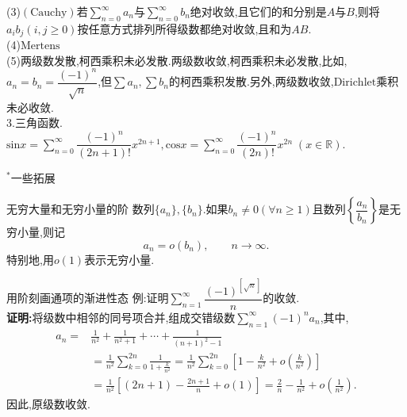 \documentclass[UTF8]{ctexbeamer}
\begin{document}
    \begin{frame}
        \hspace*{20pt}(3)$(\mathrm{Cauchy})$若$\sum\limits_{n=0}^{\infty}a_n$与$\sum\limits_{n=0}^{\infty}b_n$绝对收敛,且它们的和分别是$A$与$B$,则将$a_ib_j(i,j\geqslant 0)$按任意方式排列所得级数都绝对收敛,且和为$AB$.
        \\\hspace*{20pt}(4)$\mathrm{Mertens}$
        \\\hspace*{20pt}(5)两级数发散,柯西乘积未必发散.两级数收敛,柯西乘积未必发散,比如,$a_n=b_n=\dfrac{(-1)^n}{\sqrt{n}}$,但$\sum a_n,\sum b_n$的柯西乘积发散.另外,两级数收敛,$\mathrm{Dirichlet}$乘积未必收敛.
    \\3.三角函数.
    \\\hspace*{20pt}$\mathrm{sin}x=\sum\limits_{n=0}^{\infty}\dfrac{(-1)^n}{(2n+1)!}x^{2n+1},\mathrm{cos}x=\sum\limits_{n=0}^{\infty}\dfrac{(-1)^n}{(2n)!}x^{2n}\;(x\in\mathbb{R})$.
    \end{frame}
    \begin{frame}
        \begin{block}{}
           \begin{center}
               \Huge{$^\ast$一些拓展}
           \end{center}
        \end{block}
    \end{frame}
    \begin{frame}{无穷大量和无穷小量的阶}
        数列$\{a_n\},\{b_n\}$.如果$b_n\neq 0(\forall n\geqslant 1)$且数列$\left\{\dfrac{a_n}{b_n}\right\}$是无穷小量,则记
        $$
        a_n=o(b_n),\qquad n\to\infty.
        $$
        特别地,用$o(1)$表示无穷小量.
    \end{frame}
    \begin{frame}{用阶刻画通项的渐进性态}
        例:证明$\sum\limits_{n=1}^{\infty}\dfrac{(-1)^{[\sqrt{n}]}}{n}$的收敛.
        \pause
        \\\textbf{证明:}将级数中相邻的同号项合并,组成交错级数$\sum\limits_{n=1}^{\infty}(-1)^na_n$,其中,
        $$\begin{aligned}
            a_n=&\frac{1}{n^2}+\frac{1}{n^2+1}+\cdots+\frac{1}{(n+1)^2-1}\\
            &=\frac{1}{n^2}\sum\limits_{k=0}^{2n}\frac{1}{1+\frac{k}{n^2}}=\frac{1}{n^2}\sum\limits_{k=0}^{2n}\left[1-\frac{k}{n^2}+o\left(\frac{k}{n^2}\right)\right]\\
            &=\frac{1}{n^2}\left[(2n+1)-\frac{2n+1}{n}+o(1)\right]=\frac{2}{n}-\frac{1}{n^2}+o\left(\frac{1}{n^2}\right).
        \end{aligned}$$
        因此,原级数收敛.
    \end{frame}
\end{document}
